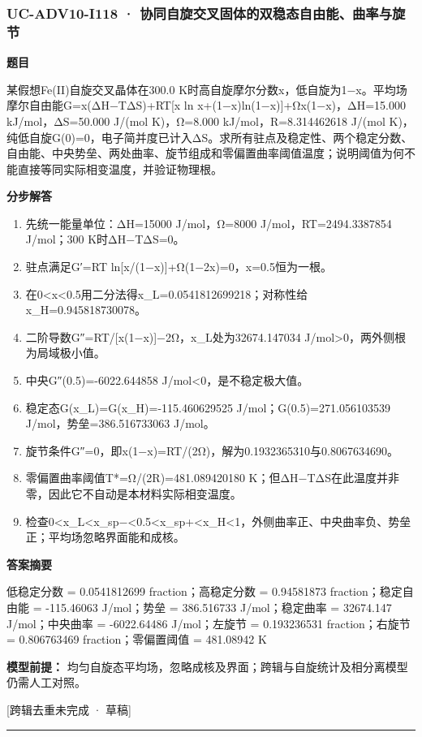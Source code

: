 \documentclass[UTF8,11pt,a4paper]{ctexart}
\begin{document}
\subsubsection*{UC-ADV10-I118 · 协同自旋交叉固体的双稳态自由能、曲率与旋节}
\noindent\textbf{题目}\par
某假想Fe(II)自旋交叉晶体在300.0 K时高自旋摩尔分数x，低自旋为1−x。平均场摩尔自由能G=x(ΔH−TΔS)+RT[x ln x+(1−x)ln(1−x)]+Ωx(1−x)，ΔH=15.000 kJ/mol，ΔS=50.000 J/(mol K)，Ω=8.000 kJ/mol，R=8.314462618 J/(mol K)，纯低自旋G(0)=0，电子简并度已计入ΔS。求所有驻点及稳定性、两个稳定分数、自由能、中央势垒、两处曲率、旋节组成和零偏置曲率阈值温度；说明阈值为何不能直接等同实际相变温度，并验证物理根。\par
\medskip\noindent\textbf{分步解答}
\begin{enumerate}
\item 先统一能量单位：ΔH=15000 J/mol，Ω=8000 J/mol，RT=2494.3387854 J/mol；300 K时ΔH−TΔS=0。
\item 驻点满足G′=RT ln[x/(1−x)]+Ω(1−2x)=0，x=0.5恒为一根。
\item 在0<x<0.5用二分法得x\_L=0.0541812699218；对称性给x\_H=0.945818730078。
\item 二阶导数G″=RT/[x(1−x)]−2Ω，x\_L处为32674.147034 J/mol>0，两外侧根为局域极小值。
\item 中央G″(0.5)=-6022.644858 J/mol<0，是不稳定极大值。
\item 稳定态G(x\_L)=G(x\_H)=-115.460629525 J/mol；G(0.5)=271.056103539 J/mol，势垒=386.516733063 J/mol。
\item 旋节条件G″=0，即x(1−x)=RT/(2Ω)，解为0.1932365310与0.8067634690。
\item 零偏置曲率阈值T*=Ω/(2R)=481.089420180 K；但ΔH−TΔS在此温度并非零，因此它不自动是本材料实际相变温度。
\item 检查0<x\_L<x\_sp−<0.5<x\_sp+<x\_H<1，外侧曲率正、中央曲率负、势垒正；平均场忽略界面能和成核。
\end{enumerate}
\noindent\textbf{答案摘要}\par
低稳定分数 = 0.0541812699 fraction；高稳定分数 = 0.94581873 fraction；稳定自由能 = -115.46063 J/mol；势垒 = 386.516733 J/mol；稳定曲率 = 32674.147 J/mol；中央曲率 = -6022.64486 J/mol；左旋节 = 0.193236531 fraction；右旋节 = 0.806763469 fraction；零偏置阈值 = 481.08942 K\par
\noindent\textbf{模型前提：}
均匀自旋态平均场，忽略成核及界面；跨辑与自旋统计及相分离模型仍需人工对照。\par
\noindent\textcolor{red!65!black}{[跨辑去重未完成 · 草稿]} \par
\medskip\hrule\medskip
{}
\end{document}
